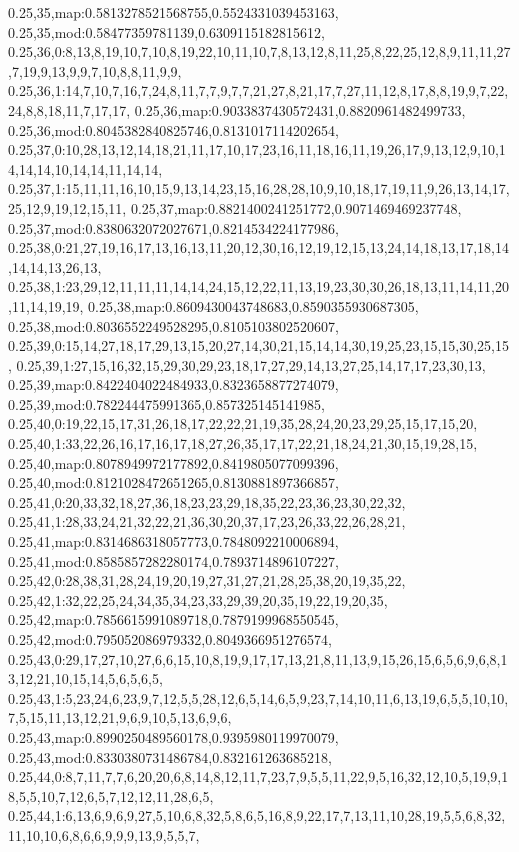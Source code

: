 0.25,35,map:0.5813278521568755,0.5524331039453163,
0.25,35,mod:0.58477359781139,0.6309115182815612,
0.25,36,0:8,13,8,19,10,7,10,8,19,22,10,11,10,7,8,13,12,8,11,25,8,22,25,12,8,9,11,11,27,7,19,9,13,9,9,7,10,8,8,11,9,9,
0.25,36,1:14,7,10,7,16,7,24,8,11,7,7,9,7,7,21,27,8,21,17,7,27,11,12,8,17,8,8,19,9,7,22,24,8,8,18,11,7,17,17,
0.25,36,map:0.9033837430572431,0.8820961482499733,
0.25,36,mod:0.8045382840825746,0.8131017114202654,
0.25,37,0:10,28,13,12,14,18,21,11,17,10,17,23,16,11,18,16,11,19,26,17,9,13,12,9,10,14,14,14,10,14,14,11,14,14,
0.25,37,1:15,11,11,16,10,15,9,13,14,23,15,16,28,28,10,9,10,18,17,19,11,9,26,13,14,17,25,12,9,19,12,15,11,
0.25,37,map:0.8821400241251772,0.9071469469237748,
0.25,37,mod:0.8380632072027671,0.8214534224177986,
0.25,38,0:21,27,19,16,17,13,16,13,11,20,12,30,16,12,19,12,15,13,24,14,18,13,17,18,14,14,14,13,26,13,
0.25,38,1:23,29,12,11,11,11,14,14,24,15,12,22,11,13,19,23,30,30,26,18,13,11,14,11,20,11,14,19,19,
0.25,38,map:0.8609430043748683,0.8590355930687305,
0.25,38,mod:0.8036552249528295,0.8105103802520607,
0.25,39,0:15,14,27,18,17,29,13,15,20,27,14,30,21,15,14,14,30,19,25,23,15,15,30,25,15,
0.25,39,1:27,15,16,32,15,29,30,29,23,18,17,27,29,14,13,27,25,14,17,17,23,30,13,
0.25,39,map:0.8422404022484933,0.8323658877274079,
0.25,39,mod:0.782244475991365,0.857325145141985,
0.25,40,0:19,22,15,17,31,26,18,17,22,22,21,19,35,28,24,20,23,29,25,15,17,15,20,
0.25,40,1:33,22,26,16,17,16,17,18,27,26,35,17,17,22,21,18,24,21,30,15,19,28,15,
0.25,40,map:0.8078949972177892,0.8419805077099396,
0.25,40,mod:0.8121028472651265,0.8130881897366857,
0.25,41,0:20,33,32,18,27,36,18,23,23,29,18,35,22,23,36,23,30,22,32,
0.25,41,1:28,33,24,21,32,22,21,36,30,20,37,17,23,26,33,22,26,28,21,
0.25,41,map:0.8314686318057773,0.7848092210006894,
0.25,41,mod:0.8585857282280174,0.7893714896107227,
0.25,42,0:28,38,31,28,24,19,20,19,27,31,27,21,28,25,38,20,19,35,22,
0.25,42,1:32,22,25,24,34,35,34,23,33,29,39,20,35,19,22,19,20,35,
0.25,42,map:0.7856615991089718,0.7879199968550545,
0.25,42,mod:0.795052086979332,0.8049366951276574,
0.25,43,0:29,17,27,10,27,6,6,15,10,8,19,9,17,17,13,21,8,11,13,9,15,26,15,6,5,6,9,6,8,13,12,21,10,15,14,5,6,5,6,5,
0.25,43,1:5,23,24,6,23,9,7,12,5,5,28,12,6,5,14,6,5,9,23,7,14,10,11,6,13,19,6,5,5,10,10,7,5,15,11,13,12,21,9,6,9,10,5,13,6,9,6,
0.25,43,map:0.8990250489560178,0.9395980119970079,
0.25,43,mod:0.8330380731486784,0.832161263685218,
0.25,44,0:8,7,11,7,7,6,20,20,6,8,14,8,12,11,7,23,7,9,5,5,11,22,9,5,16,32,12,10,5,19,9,18,5,5,10,7,12,6,5,7,12,12,11,28,6,5,
0.25,44,1:6,13,6,9,6,9,27,5,10,6,8,32,5,8,6,5,16,8,9,22,17,7,13,11,10,28,19,5,5,6,8,32,11,10,10,6,8,6,6,9,9,9,13,9,5,5,7,
